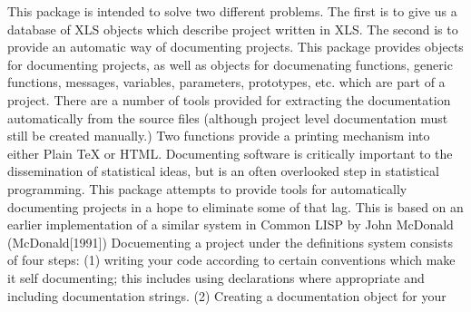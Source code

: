 
\hfuzz=5pt


\beginMotivationDesc
 This package is intended to solve two different
  problems.  The first is to give us a database of XLS objects which
  describe project written in XLS.  The second is to provide an
  automatic way of documenting projects. 
\endMotivationDesc
{}
\projectReviewer{ }{ }
\beginFunctionalDesc
 This package provides objects for
  documenting projects, as well as objects for documenating functions,
  generic functions, messages, variables, parameters, prototypes,
  etc. which are part of a project.  There are a number of tools
  provided for extracting the documentation automatically from the
  source files (although project level documentation must still be
  created manually.)  Two functions provide a printing mechanism into
  either Plain TeX or HTML. 
\endFunctionalDesc
\beginStatDesc
 Documenting software is critically
  important to the dissemination of statistical ideas, but is an often
  overlooked step in statistical programming.  This package attempts
  to provide tools for automatically documenting projects in a hope to
  eliminate some of that lag.   This is based on an earlier
  implementation of a similar system in Common LISP by John McDonald
  (McDonald[1991]) 
\endStatDesc
\beginRefs
{}
\endRefs
\beginInstructions
 Docuementing a project under the
  definitions system consists of four steps:  (1) writing your code
  according to certain conventions which make it self documenting;
  this includes using declarations where appropriate and including
  documentation strings.  (2) Creating a documentation object for your
